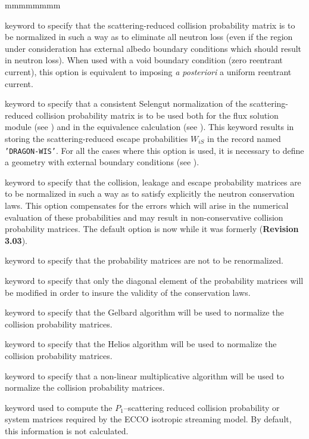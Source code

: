 \begin{ListeDeDescription}{mmmmmmmm}
\item[\moc{NORM}] keyword to specify that the scattering-reduced collision probability matrix is
to be normalized in such a way as to eliminate all neutron loss (even if the
region under consideration has external albedo boundary conditions which should
result in neutron loss). When used with a void boundary condition (zero reentrant
current), this option is equivalent to imposing  {\it a posteriori} a uniform
reentrant current.

\item[\moc{ALBS}] keyword to specify that a consistent Selengut normalization
of the scattering-reduced collision probability matrix is to be used both for the flux solution
module (see ) and in the equivalence calculation (see
). This keyword results in storing the scattering-reduced escape probabilities
$W_{iS}$ in the record named {\tt 'DRAGON-WIS'}. For all the cases where this option is used, it is necessary to
define a geometry with  external boundary conditions (see
).

\item[\moc{PNOR}] keyword to specify that the collision, leakage and escape
probability matrices are to be normalized in such a way as to satisfy explicitly
the neutron conservation laws. This option compensates for the errors which will
arise in the numerical evaluation of these probabilities and may result in
non-conservative collision probability matrices. The default option is now  while it was
formerly  ({\bf Revision 3.03}).

\item[\moc{NONE}] keyword to specify that the probability matrices are not to
be renormalized.

\item[\moc{DIAG}] keyword to specify that only the diagonal element of the
probability matrices will be modified in order to insure the validity of the
conservation laws.

\item[\moc{GELB}] keyword to specify that the Gelbard algorithm will be used
to normalize the collision probability matrices.\cite{RENOR} 

\item[\moc{HELI}] keyword to specify that the Helios algorithm will be used
to normalize the collision probability matrices.\cite{Helios} 

\item[\moc{NONL}] keyword to specify that a non-linear multiplicative
algorithm will be used to normalize the collision probability
matrices.\cite{RENOR} 

\item[\moc{ECCO}] keyword used to compute the $P_1$--scattering reduced
collision probability or system matrices required by the ECCO isotropic
streaming model. By default, this information is not calculated.

\end{ListeDeDescription}
\eject
